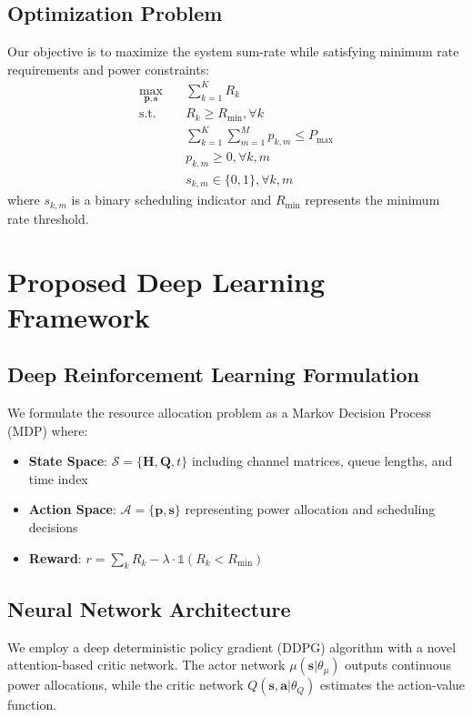 \documentclass[journal]{IEEEtran}
\begin{document}
\subsection{Optimization Problem}
Our objective is to maximize the system sum-rate while satisfying minimum rate requirements and power constraints:
\begin{align}
\max_{\mathbf{p}, \mathbf{s}} \quad & \sum_{k=1}^{K} R_k \\
\text{s.t.} \quad & R_k \geq R_{\min}, \forall k \\
& \sum_{k=1}^{K} \sum_{m=1}^{M} p_{k,m} \leq P_{\max} \\
& p_{k,m} \geq 0, \forall k,m \\
& s_{k,m} \in \{0, 1\}, \forall k,m
\end{align}
where $s_{k,m}$ is a binary scheduling indicator and $R_{\min}$ represents the minimum rate threshold.

\section{Proposed Deep Learning Framework}
\subsection{Deep Reinforcement Learning Formulation}
We formulate the resource allocation problem as a Markov Decision Process (MDP) where:
\begin{itemize}
    \item \textbf{State Space}: $\mathcal{S} = \{\mathbf{H}, \mathbf{Q}, t\}$ including channel matrices, queue lengths, and time index
    \item \textbf{Action Space}: $\mathcal{A} = \{\mathbf{p}, \mathbf{s}\}$ representing power allocation and scheduling decisions
    \item \textbf{Reward}: $r = \sum_{k} R_k - \lambda \cdot \mathbb{1}(R_k < R_{\min})$
\end{itemize}

\subsection{Neural Network Architecture}
We employ a deep deterministic policy gradient (DDPG) algorithm with a novel attention-based critic network. The actor network $\mu(\mathbf{s}|\theta_\mu)$ outputs continuous power allocations, while the critic network $Q(\mathbf{s}, \mathbf{a}|\theta_Q)$ estimates the action-value function.
\end{document}
